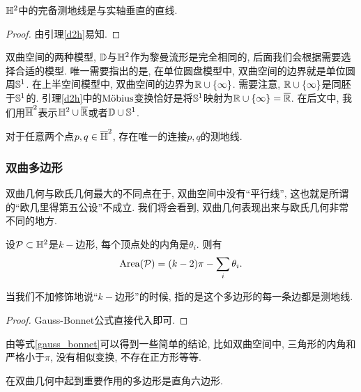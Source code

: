 \begin{theorem}
    $\HH$中的完备测地线是与实轴垂直的直线.
\end{theorem}
\begin{proof}
    由引理\eqref{d2h}易知.
\end{proof}
\begin{remark}
    双曲空间的两种模型, $\D$与$\HH$作为黎曼流形是完全相同的, 后面我们会根据需要选择合适的模型. 唯一需要指出的是, 在单位圆盘模型中,  双曲空间的边界就是单位圆周$\S^1$. 在上半空间模型中, 双曲空间的边界为$\R \cup \{\infty\}$.  需要注意, $\R\cup \{\infty\}$是同胚于$\S^1$的.  引理\eqref{d2h}中的$\mobius$变换恰好是将$\S^1$映射为$\R \cup \{\infty\}=\RR$.  在后文中, 我们用$\HC$表示$\HH \cup \RR$或者$\D \cup \S^1$.
\end{remark}
\begin{corollary} \label{unique_geodesic}
    对于任意两个点$p,q \in \HC$, 存在唯一的连接$p,q$的测地线.
\end{corollary}
\subsubsection{双曲多边形}
双曲几何与欧氏几何最大的不同点在于, 双曲空间中没有``平行线'',  这也就是所谓的``欧几里得第五公设''不成立.  我们将会看到, 双曲几何表现出来与欧氏几何非常不同的地方.
\begin{proposition}
    设$\Polygon \subset \HH$是$k-$边形, 每个顶点处的内角是$\theta_i$.  则有
    \begin{equation} \label{gauss_bonnet}
        \Area(\Polygon)=(k-2)\pi - \sum_{i}\theta_i.
    \end{equation}
\end{proposition}
\begin{remark}
    当我们不加修饰地说``$k-$边形''的时候, 指的是这个多边形的每一条边都是测地线.
\end{remark}
\begin{proof}
    Gauss-Bonnet公式直接代入即可.
\end{proof}
由等式\eqref{gauss_bonnet}可以得到一些简单的结论, 比如双曲空间中, 三角形的内角和严格小于$\pi$, 没有相似变换, 不存在正方形等等. 
\par 在双曲几何中起到重要作用的多边形是直角六边形. 
